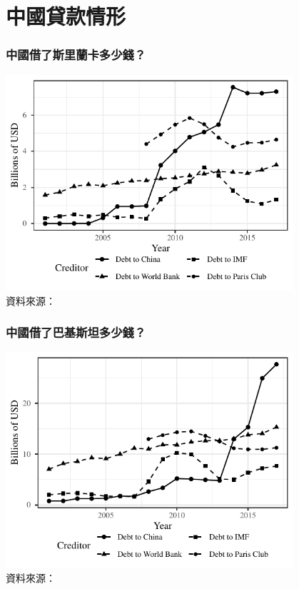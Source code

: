 \documentclass[mathserif]{beamer}
\begin{document}
    \section{中國貸款情形}

    \begin{frame}
        \frametitle{中國借了斯里蘭卡多少錢？}
        \begin{center}
            \includegraphics[width = 0.8\textwidth]{fig/ALL/Sri Lanka_debt_source.pdf}\\
            \small 資料來源：\citet*{Horn-Reinhart-Trebesch-21}
        \end{center}
    \end{frame}

    \begin{frame}
        \frametitle{中國借了巴基斯坦多少錢？}
        \begin{center}
            \includegraphics[width = 0.8\textwidth]{fig/ALL/Pakistan_debt_source.pdf}\\
            \small 資料來源：\citet*{Horn-Reinhart-Trebesch-21}
        \end{center}
    \end{frame}
\end{document}
